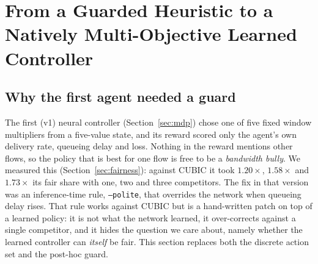 \section{From a Guarded Heuristic to a Natively Multi-Objective Learned Controller}
\label{sec:truesmart}

\subsection{Why the first agent needed a guard}
The first (v1) neural controller (Section~\ref{sec:mdp}) chose one of five fixed window multipliers from a five-value state, and its reward scored only the agent's own delivery rate, queueing delay and loss. Nothing in the reward mentions other flows, so the policy that is best for one flow is free to be a \emph{bandwidth bully}. We measured this (Section~\ref{sec:fairness}): against CUBIC it took $1.20\times$, $1.58\times$ and $1.73\times$ its fair share with one, two and three competitors. The fix in that version was an inference-time rule, \texttt{--polite}, that overrides the network when queueing delay rises. That rule works against CUBIC but is a hand-written patch on top of a learned policy: it is not what the network learned, it over-corrects against a single competitor, and it hides the question we care about, namely whether the learned controller can \emph{itself} be fair. This section replaces both the discrete action set and the post-hoc guard.

